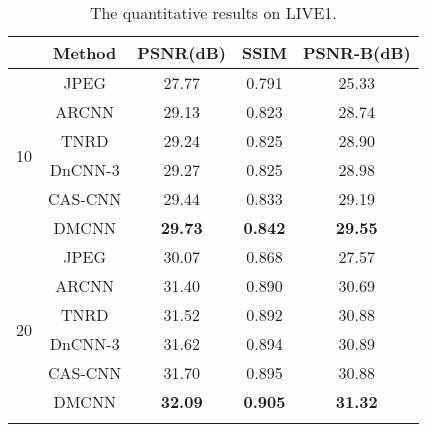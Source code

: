 \documentclass{article}
\begin{document}
\begin{table}[!htb]
  \vspace{-0.5cm}
  \caption{The quantitative results on LIVE1.}\medskip
  \vspace{-0.1cm}
  \centering
  \begin{tabular}{c|c|c|c|c}
  \Xhline{2\arrayrulewidth}{QF}
  &Method                            &PSNR(dB)       &SSIM           &PSNR-B(dB)    \\ 
  \hline
  \multirow{6}{*}{10}
  &JPEG                              &27.77          &0.791          &25.33         \\
  &ARCNN \cite{dong2015compression}  &29.13          &0.823          &28.74         \\
  &TNRD \cite{chen2017trainable}     &29.24          &0.825          &28.90         \\
  &DnCNN-3 \cite{zhang2017beyond}    &29.27          &0.825          &28.98         \\
  &CAS-CNN \cite{cavigelli2017cas}   &29.44          &0.833          &29.19         \\
  &DMCNN                             &\textbf{29.73} &\textbf{0.842} &\textbf{29.55}\\
  \hline
  \multirow{6}{*}{20}
  &JPEG                              &30.07          &0.868          &27.57         \\
  &ARCNN \cite{dong2015compression}  &31.40          &0.890          &30.69         \\
  &TNRD \cite{chen2017trainable}     &31.52          &0.892          &30.88         \\
  &DnCNN-3 \cite{zhang2017beyond}    &31.62          &0.894          &30.89         \\
  &CAS-CNN \cite{cavigelli2017cas}   &31.70          &0.895          &30.88         \\
  &DMCNN                             &\textbf{32.09} &\textbf{0.905} &\textbf{31.32}\\
  \Xhline{2\arrayrulewidth}
  \multicolumn{5}{c}{}\\
\end{tabular}
\label{tab:t1}
\vspace{-0.8cm}
\end{table}
\end{document}
